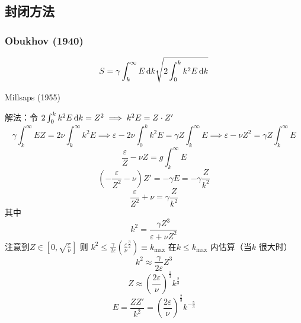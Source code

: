 \documentclass[12pt]{ctexart}
\begin{document}
\subsection{封闭方法}

\subsubsection{Obukhov (1940)}

\begin{equation}
   S = \gamma \int_{k}^{\infty} E \dif k \sqrt{2 \int_{0}^{k} k^2 E \dif k }  
\end{equation}

Millsaps (1955)

解法：令 $2 \int_{0}^{k} k^2 E \dif k = Z^2 \implies k^2 E = Z\cdot Z'$
\begin{equation}
   \gamma \int_{k}^{\infty} E Z = 2 \nu \int_{k}^{\infty} k^2 E \implies \varepsilon - 2 \nu \int_{0}^{k} k^2 E = \gamma Z \int_{k}^{\infty} E \implies\varepsilon - \nu Z^2 = \gamma Z \int_{k}^{\infty} E     
\end{equation}
\begin{equation}
   \frac{\varepsilon}{Z} - \nu Z = g \int_{k}^{\infty} E 
\end{equation}
\begin{equation}
   \left( - \frac{\varepsilon}{Z^2} - \nu \right) Z' = - \gamma E = - \gamma \frac{Z}{k^2}
\end{equation}
\begin{equation}
   \frac{\varepsilon}{Z^2} + \nu = \gamma \frac{Z}{k^2}
\end{equation}
其中
\begin{equation}
   k^2 = \frac{\gamma Z^3}{\varepsilon + \nu Z^2}
\end{equation}
注意到$Z \in \left[0, \sqrt{\frac{\varepsilon}{\nu}}  \right]$ 则 $k^2 \le \frac{\gamma}{2\varepsilon} \left( \frac{\varepsilon}{\nu}^{\frac{3}{2}} \right) \equiv k_{\max}$
在$k\le k_{\max}$ 内估算（当$k$ 很大时）
\begin{equation}
   k^2 \approx \frac{\gamma}{2\varepsilon} Z^3
\end{equation}
\begin{equation}
   Z \approx \left( \frac{2\varepsilon}{\nu} \right)^{\frac{1}{3}} k^{\frac{2}{3}}
\end{equation}
\begin{equation}
   E = \frac{Z Z'}{k^2} = \left( \frac{2\varepsilon}{\nu} \right) ^{\frac{2}{3}} k^{- \frac{5}{3}}
\end{equation}
\end{document}
